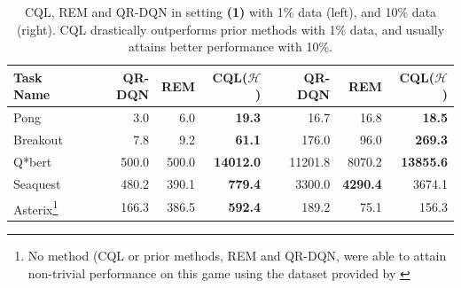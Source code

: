 \begin{table}[h]
    \centering
    \begin{tabular}{l|r|r|r|||r|r|r}
    \hline
        \textbf{Task Name} & \textbf{QR-DQN} & \textbf{REM} & \textbf{CQL($\mathcal{H}$)}  & \textbf{QR-DQN} & \textbf{REM} & \textbf{CQL($\mathcal{H}$)}  \\
        \hline
         Pong & 3.0 & 6.0 & \textbf{19.3} & 16.7 & 16.8 & \textbf{18.5} \\
         Breakout & 7.8 & 9.2 & \textbf{61.1} & 176.0 & 96.0 & \textbf{269.3} \\
         Q*bert & 500.0 & 500.0 & \textbf{14012.0}& 11201.8 & 8070.2 & \textbf{13855.6}\\
         Seaquest & 480.2 & 390.1 & \textbf{779.4} & 3300.0 & \textbf{4290.4} & 3674.1 \\
         Asterix\footnote{No method (CQL or prior methods, REM and QR-DQN, were able to attain non-trivial performance on this game using the dataset provided by \citet{agarwal2019optimistic}} & 166.3 & 386.5 & \textbf{592.4} & 189.2 & 75.1 & 156.3 \\
         \hline
    \end{tabular}
    \caption{{\footnotesize CQL, REM and QR-DQN in setting \textbf{(1)} with 1\% data (left), and 10\% data (right). CQL drastically outperforms prior methods with 1\% data, and usually attains better performance with 10\%.}}
    \label{table:atari_reduced_size}
\end{table}




